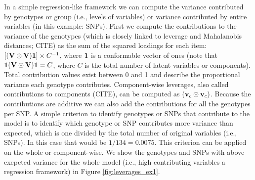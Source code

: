 \documentclass[12pt]{article}
\begin{document}
In a simple regression-like framework we can compute the variance
contributed by genotypes or group (i.e., levels of variables) or
variance contributed by entire variables (in this example: SNPs). First
we compute the contributions to the variance of the genotypes (which is
closely linked to leverage and Mahalanobis distances; CITE) as the sum
of the squared loadings for each item:
\([({\bf V} \odot {\bf V}){\bf 1}] \times C^{-1}\), where \({\bf 1}\) is
a conformable vector of ones (note that
\({\bf 1}({\bf V} \odot {\bf V}){\bf 1} = C\), where \(C\) is the total
number of latent variables or components). Total contribution values
exist between 0 and 1 and describe the proportional variance each
genotype contributes. Component-wise leverages, also called
contributions to components (CITE), can be computed as
\(({\bf v}_{c} \odot {\bf v}_{c})\). Because the contributions are
additive we can also add the contributions for all the genotypes per
SNP. A simple criterion to identify genotypes or SNPs that contribute to
the model is to identify which genotype or SNP contributes more variance
than expected, which is one divided by the total number of original
variables (i.e., SNPs). In this case that would be \(1/ 134 = 0.0075\).
This criterion can be applied on the whole or component-wise. We show
the genotypes and SNPs with above exepcted variance for the whole model
(i.e., high contributing variables a regression framework) in Figure
\ref{fig:leverages_ex1}.
\end{document}
